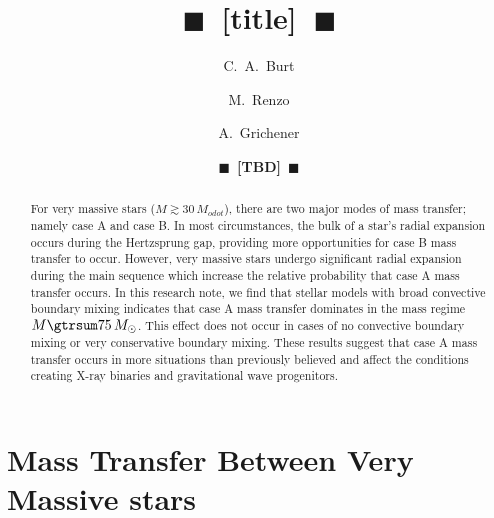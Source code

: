 \documentclass[twocolumn]{aastex63}
\newcommand{\todo}[1]{{\large $\blacksquare$~\textbf{\color{red}[#1]}}~$\blacksquare$}
\begin{document}
\title{\todo{title}}

\author[0009-0008-2061-4946]{C.~A.~Burt}

\author[0000-0002-6718-9472]{M.~Renzo}

\author[0000-0002-2215-1841]{A.~Grichener}

\author{\todo{TBD}}

\begin{abstract}
  For very massive stars ($M \gtrsim 30 \, M_{odot}$), there are two major modes of mass transfer; namely case A and case B. In most circumstances, the bulk of a star's radial expansion occurs during the Hertzsprung gap, providing more opportunities for case B mass transfer to occur. However, very massive stars undergo significant radial expansion during the main sequence which increase the relative probability that case A mass transfer occurs. In this research note, we find that stellar models with broad convective boundary mixing indicates that case A mass transfer dominates in the mass regime $M \gtrsum 75 \, M_{\odot}$. This effect does not occur in cases of no convective boundary mixing or very conservative boundary mixing. These results suggest that case A mass transfer occurs in more situations than previously believed and affect the conditions creating X-ray binaries and gravitational wave progenitors.
\end{abstract}

\section{Mass Transfer Between Very Massive stars }
\end{document}
